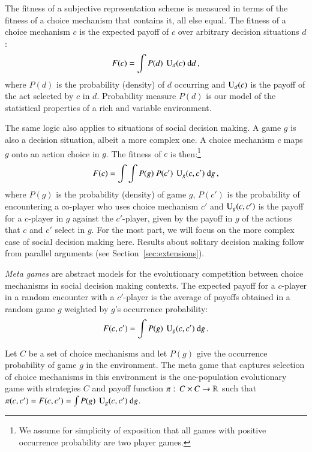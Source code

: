 \documentclass[fleqn,reqno,11pt]{article}
\begin{document}
The fitness of a subjective representation scheme is measured in terms of the fitness of a
choice mechanism that contains it, all else equal. The fitness of a choice mechanism $c$ is the
expected payoff of $c$ over arbitrary decision situations $d$:
\begin{align}
  \label{eq:FittnessChoiceMechSolitary}
  F(c) = \int P(d) \  \operatorname{U}_d(c) \text{ d} d \,,
\end{align}
where $P(d)$ is the probability (density) of $d$ occurring and $\operatorname{U}_d(c)$ is the payoff of
the act selected by $c$ in $d$. Probability measure $P(d)$ is our model of the statistical
properties of a rich and variable environment.

The same logic also applies to situations of social decision making. A game $g$ is also a
decision situation, albeit a more complex one. A choice mechanism $c$ maps $g$ onto an action
choice in $g$. The fitness of $c$ is then:\footnote{We assume for simplicity of exposition that
  all games with positive occurrence probability are two player games.}
\begin{align}
  \label{eq:FittnessChoiceMechGame}
  F(c) = \int \int P(g) \  P(c') \  \operatorname{U}_g(c,c') \text{ d} g \,,
\end{align}
where $P(g)$ is the probability (density) of game $g$, $P(c')$ is the probability of
encountering a co-player who uses choice mechanism $c'$ and $\operatorname{U}_g(c,c')$ is the payoff for
a $c$-player in $g$ against the $c'$-player, given by the payoff in $g$ of the actions that $c$
and $c'$ select in $g$. For the most part, we will focus on the more complex case of social
decision making here. Results about solitary decision making follow from parallel arguments
(see Section~\ref{sec:extensions}).

\emph{Meta games} are abstract models for the evolutionary competition between choice
mechanisms in social decision making contexts. The expected payoff for a $c$-player in a random
encounter with a $c'$-player is the average of payoffs obtained in a random game $g$ weighted
by $g$'s occurrence probability:
\begin{align}
  \label{eq:FittnessChoiceMechGamePairwise}
  F(c, c') = \int P(g) \  \operatorname{U}_g(c,c') \text{ d} g \,.
\end{align}

\begin{definition}
  \label{def:MetaGame}
  Let $C$ be a set of choice mechanisms and let $P(g)$ give the occurrence probability of game
  $g$ in the environment. The meta game that captures selection of choice mechanisms in this
  environment is the one-population evolutionary game with strategies $C$ and payoff function
  $\pi \thinspace \colon \thinspace C \times C \rightarrow \mathbb{R}$ such that
  $\pi(c,c') = F(c,c') = \int P(g) \  \operatorname{U}_g(c,c') \text{ d} g$.
\end{definition}
\end{document}
